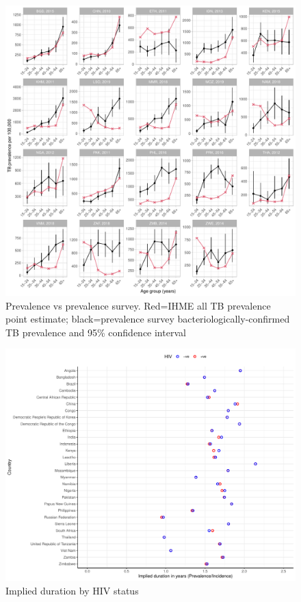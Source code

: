 \documentclass[12pt]{article}
\begin{document}
\FloatBarrier

\begin{figure}
\centering
\includegraphics[width=1\textwidth]{../plots/aF3.pdf}
\caption{Prevalence vs prevalence survey. Red=IHME all TB prevalence point
  estimate; black=prevalence survey bacteriologically-confirmed TB prevalence
  and 95\% confidence interval}
\end{figure}

\FloatBarrier

\begin{figure}
  \centering
  \includegraphics[width=1\textwidth]{../plots/aF7.pdf}
  \caption{Implied duration by HIV status}
\end{figure}
\end{document}
